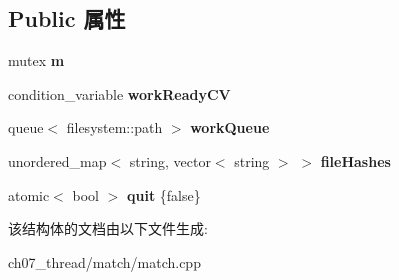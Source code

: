\subsection*{Public 属性}
\begin{DoxyCompactItemize}
\item 
\mbox{\label{struct_work_controller_a7e0fe66e86710ee56b28705f2813a0a9}} 
mutex {\bfseries m}
\item 
\mbox{\label{struct_work_controller_a0ca689a9180d46a6c22f070cbead965f}} 
condition\+\_\+variable {\bfseries work\+Ready\+CV}
\item 
\mbox{\label{struct_work_controller_afb94ca27764337090b29492368d5d494}} 
queue$<$ filesystem\+::path $>$ {\bfseries work\+Queue}
\item 
\mbox{\label{struct_work_controller_a25fb1101d20bfc1e1733a57454e34cf7}} 
unordered\+\_\+map$<$ string, vector$<$ string $>$ $>$ {\bfseries file\+Hashes}
\item 
\mbox{\label{struct_work_controller_a0d9ee1c1a095461a7a6264fe8c225df1}} 
atomic$<$ bool $>$ {\bfseries quit} \{false\}
\end{DoxyCompactItemize}


该结构体的文档由以下文件生成\+:\begin{DoxyCompactItemize}
\item 
ch07\+\_\+thread/match/match.\+cpp\end{DoxyCompactItemize}
